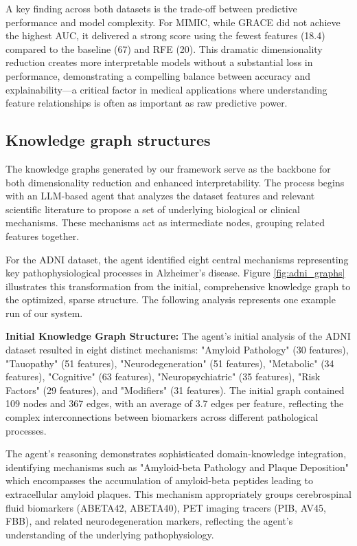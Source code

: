 \documentclass{article}
\begin{document}
A key finding across both datasets is the trade-off between predictive performance and model complexity. For MIMIC, while GRACE did not achieve the highest AUC, it delivered a strong score using the fewest features (18.4) compared to the baseline (67) and RFE (20). This dramatic dimensionality reduction creates more interpretable models without a substantial loss in performance, demonstrating a compelling balance between accuracy and explainability—a critical factor in medical applications where understanding feature relationships is often as important as raw predictive power.

\subsection{Knowledge graph structures}
The knowledge graphs generated by our framework serve as the backbone for both dimensionality reduction and enhanced interpretability. The process begins with an LLM-based agent that analyzes the dataset features and relevant scientific literature to propose a set of underlying biological or clinical mechanisms. These mechanisms act as intermediate nodes, grouping related features together.

For the ADNI dataset, the agent identified eight central mechanisms representing key pathophysiological processes in Alzheimer's disease. Figure \ref{fig:adni_graphs} illustrates this transformation from the initial, comprehensive knowledge graph to the optimized, sparse structure. The following analysis represents one example run of our system.

\textbf{Initial Knowledge Graph Structure:} The agent's initial analysis of the ADNI dataset resulted in eight distinct mechanisms: "Amyloid Pathology" (30 features), "Tauopathy" (51 features), "Neurodegeneration" (51 features), "Metabolic" (34 features), "Cognitive" (63 features), "Neuropsychiatric" (35 features), "Risk Factors" (29 features), and "Modifiers" (31 features). The initial graph contained 109 nodes and 367 edges, with an average of 3.7 edges per feature, reflecting the complex interconnections between biomarkers across different pathological processes.

The agent's reasoning demonstrates sophisticated domain-knowledge integration, identifying mechanisms such as "Amyloid-beta Pathology and Plaque Deposition" which encompasses the accumulation of amyloid-beta peptides leading to extracellular amyloid plaques. This mechanism appropriately groups cerebrospinal fluid biomarkers (ABETA42, ABETA40), PET imaging tracers (PIB, AV45, FBB), and related neurodegeneration markers, reflecting the agent's understanding of the underlying pathophysiology.
\end{document}

